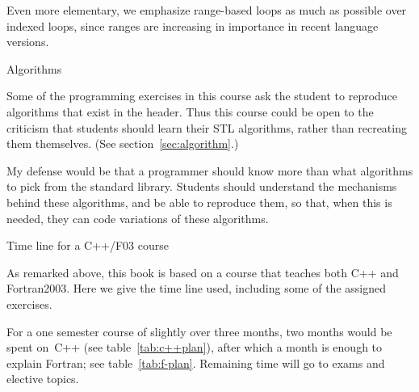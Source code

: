 Even more elementary, we emphasize range-based loops as much as
possible over indexed loops, since ranges are increasing in importance
in recent language versions.

 {Algorithms}

Some of the programming exercises in this course
ask the student to reproduce algorithms
that exist in the  header.
Thus this course could be open to the criticism that
students should learn their \ac{STL} algorithms,
rather than recreating them themselves.
(See section~\ref{sec:algorithm}.)

My defense would be that a programmer should know
more than what algorithms to pick from the standard library.
Students should understand the mechanisms behind these algorithms,
and be able to reproduce them, so that, when this is needed,
they can code variations of these algorithms.

 {Time line for a C++/F03 course}

As remarked above, this book is based on a course that teaches both
C++ and Fortran2003. Here we give the time line used, including some of
the assigned exercises.

For a one semester course of slightly over three months, two months
would be spent on~C++ (see table~\ref{tab:c++plan}), after which a
month is enough to explain Fortran; see table~\ref{tab:f-plan}.
Remaining time will go to exams
and elective topics.



